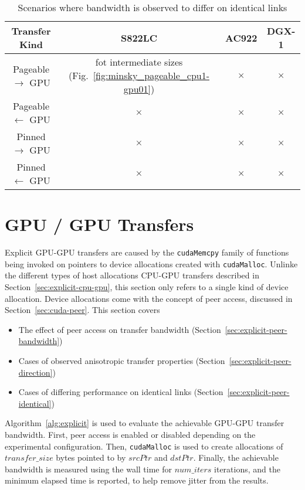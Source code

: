 \begin{table}[ht]
    \centering
    \caption[Matrix: Transfer rate vary on identical links]{Scenarios where bandwidth is observed to differ on identical links}
    \label{tab:explicit-identical}
    \begin{tabular}{|c|c|c|c|}
    \hline
    \textbf{Transfer Kind}     & \textbf{S822LC}     & \textbf{AC922} & \textbf{DGX-1} \\ \hline 
    Pageable $\rightarrow$ GPU & fot intermediate sizes (Fig.~\ref{fig:minsky_pageable_cpu1-gpu01}) & $\times$ & $\times$ \\ \hline
    Pageable $\leftarrow$ GPU  & $\times$ & $\times$ & $\times$ \\ \hline
    Pinned $\rightarrow$ GPU   & $\times$ & $\times$ & $\times$ \\ \hline
    Pinned $\leftarrow$ GPU    & $\times$ & $\times$ & $\times$ \\ \hline
    \end{tabular}
\end{table}

\section{GPU / GPU Transfers}
\label{sec:explicit-gpu-gpu}

Explicit GPU-GPU transfers are caused by the \texttt{cudaMemcpy} family of functions being invoked on pointers to device allocations created with \texttt{cudaMalloc}.
Unlinke the different types of host allocations CPU-GPU transfers described in Section~\ref{sec:explicit-cpu-gpu}, this section only refers to a single kind of device allocation.
Device allocations come with the concept of peer access, discussed in Section~\ref{sec:cuda-peer}.
This section covers
\begin{itemize}
\item The effect of peer access on transfer bandwidth (Section~\ref{sec:explicit-peer-bandwidth})
\item Cases of observed anisotropic transfer properties (Section~\ref{sec:explicit-peer-direction})
\item Cases of differing performance on identical links (Section~\ref{sec:explicit-peer-identical})
\end{itemize}

Algorithm~\ref{alg:explicit} is used to evaluate the achievable GPU-GPU transfer bandwidth.
First, peer access is enabled or disabled depending on the experimental configuration.
Then, \texttt{cudaMalloc} is used to create allocations of $transfer\_size$ bytes pointed to by $srcPtr$ and $dstPtr$.
Finally, the achievable bandwidth is measured using the wall time for $num\_iters$ iterations, and the minimum elapsed time is reported, to help remove jitter from the results.

